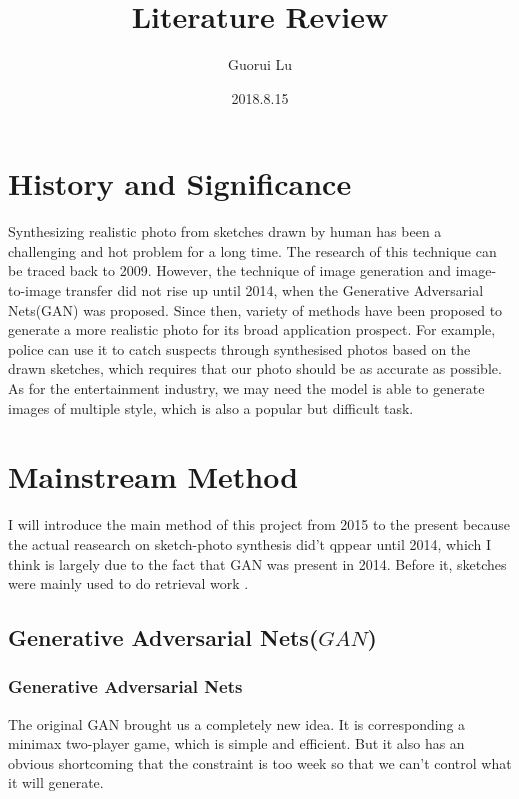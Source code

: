 \documentclass{article}
\title{Literature Review}
\author{Guorui Lu}
\date{2018.8.15}
\begin{document}
\maketitle

\section{History and Significance}

\indent Synthesizing realistic photo from sketches drawn by human has been a challenging and hot problem for a long time. The research of this technique can be traced back to 2009\cite{Chen2009Sketch2Photo}. However, the technique of image generation and image-to-image transfer did not rise up until 2014, when the Generative Adversarial Nets(GAN)\cite{Goodfellow2014Generative} was proposed. Since then, variety of methods have been proposed to generate a more realistic photo for its broad application prospect. For example, police can use it to catch suspects through synthesised photos based on the drawn sketches, which requires that our photo should be as accurate as possible. As for the entertainment industry, we may need the model is able to generate images of multiple style, which is also a popular but difficult task.

\section{Mainstream Method}
\indent I will introduce the main method of this project from 2015 to the present because the actual reasearch on sketch-photo synthesis did't qppear until 2014, which I think is largely due to the fact that GAN \cite{Goodfellow2014Generative} was present in 2014. Before it, sketches were mainly used to do retrieval work \cite{Cao2010MindFinder, Eitz2010An, Hu2010Gradient, Wang2010MindFinder, Cao2011Edgel, Hu2011A, Hu2013A, Lin20143D}.


\subsection{Generative Adversarial Nets($GAN$)}

\subsubsection{Generative Adversarial Nets}
\indent The original GAN brought us a completely new idea. It is corresponding a minimax two-player game, which is simple and efficient. But it also has an obvious shortcoming that the constraint is too week so that we can't control what it will generate.
\end{document}
